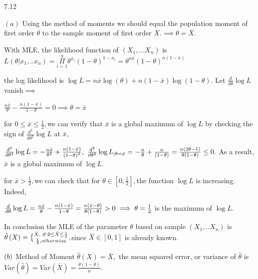 \documentclass{article}
\def\QATOPD#1#2#3#4{{#3 \atopwithdelims#1#2 #4}}%
\begin{document}
7.12

$\left( a\right) $ Using the method of moments we should equal the
population moment of first order $\theta $ to the sample moment of first
order $\overline{X}.\implies \theta =\overline{X}.$

With MLE, the likelihood function of $\left( X_{1},...X_{n}\right) $ is $%
L\left( \theta |x_{1},..x_{n}\right) =\underset{i=1}{\overset{n}{\Pi }}%
\theta ^{x_{i}}\left( 1-\theta \right) ^{1-x_{i}}=\theta ^{n\bar{x}}\left(
1-\theta \right) ^{n\left( 1-\bar{x}\right) }$

the log likelihood is $\log L=n\bar{x}\log \left( \theta \right) +n\left( 1-%
\bar{x}\right) \log \left( 1-\theta \right) .$ Let $\frac{d}{d\theta }\log L$
vanish$\implies $

$\frac{n\bar{x}}{\theta }-\frac{n\left( 1-\bar{x}\right) }{1-\theta }%
=0\implies \theta =\bar{x}$

for 0$\leq \bar{x}\leq \frac{1}{2},$we can verify that $\bar{x}$ is a global
maximum of $\log L$ by checking the sign of $\frac{d^{2}}{d\theta ^{2}}\log
L $ at $\bar{x},$

$\frac{d^{2}}{d\theta ^{2}}\log L=-\frac{n\bar{x}}{\theta ^{2}}+\frac{%
n\left( 1-\bar{x}\right) }{\left( 1-\theta \right) ^{2}},$ $\frac{d^{2}}{%
d\theta ^{2}}\log L_{|\theta =\bar{x}}=-\frac{n}{\theta }+\frac{n}{\left(
1-\theta \right) }=\frac{n\left( 2\theta -1\right) }{\theta \left( 1-\theta
\right) }\leq 0.$ As a result, $\bar{x}$ is a global maximum of $\log L.$

\bigskip for $\bar{x}>\frac{1}{2},$we can check that for $\theta \in \left[
0,\frac{1}{2}\right] ,$the function $\log L$ is increasing. Indeed,

$\bigskip \frac{d}{d\theta }\log L=\frac{n\bar{x}}{\theta }-\frac{n\left( 1-%
\bar{x}\right) }{1-\theta }=\frac{n\left( \bar{x}-\theta \right) }{\theta
\left( 1-\theta \right) }>0\implies \theta =\frac{1}{2}$ is the maximum of $%
\log L.$

In conclusion the MLE of the parameter $\theta $ based on sample $\left(
X_{1},..X_{n}\right) $ is $\hat{\theta}\left( X\right) =\QATOPD\{ . {\bar{X},%
\text{ if 0}\leq \bar{X}\leq \frac{1}{2}}{\frac{1}{2},otherwise},$since $%
\bar{X}\in \left[ 0,1\right] $ is already known.

$\bigskip \left( b\right) $ Method of Moment $\hat{\theta}\left( X\right) =%
\bar{X},$ the mean squared error, or variance of $\hat{\theta}$ is $%
Var\left( \hat{\theta}\right) =Var\left( \bar{X}\right) =\frac{\theta \left(
1-\theta \right) }{n}.$
\end{document}
